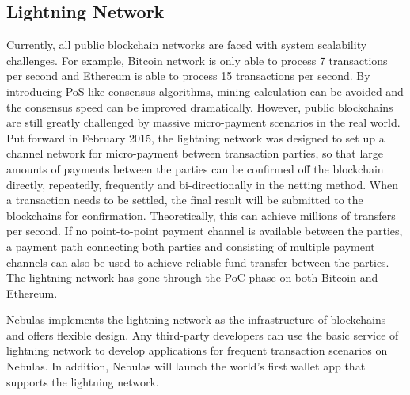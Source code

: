 \subsection{Lightning Network}

Currently, all public blockchain networks are faced with system scalability challenges. For example, Bitcoin network is only able to process 7 transactions per second and Ethereum is able to process 15 transactions per second. By introducing PoS-like consensus algorithms, mining calculation can be avoided and the consensus speed can be improved dramatically. However, public blockchains are still greatly challenged by massive micro-payment scenarios in the real world. Put forward in February 2015, the lightning network \cite{poon2015bitcoin} was designed to set up a channel network for micro-payment between transaction parties, so that large amounts of payments between the parties can be confirmed off the blockchain directly, repeatedly, frequently and bi-directionally in the netting method. When a transaction needs to be settled, the final result will be submitted to the blockchains for confirmation. Theoretically, this can achieve millions of transfers per second. If no point-to-point payment channel is available between the parties, a payment path connecting both parties and consisting of multiple payment channels can also be used to achieve reliable fund transfer between the parties. The lightning network has gone through the PoC phase on both Bitcoin and Ethereum.


Nebulas implements the lightning network as the infrastructure of blockchains and offers flexible design. Any third-party developers can use the basic service of lightning network to develop applications for frequent transaction scenarios on Nebulas. In addition, Nebulas will launch the world's first wallet app that supports the lightning network.

